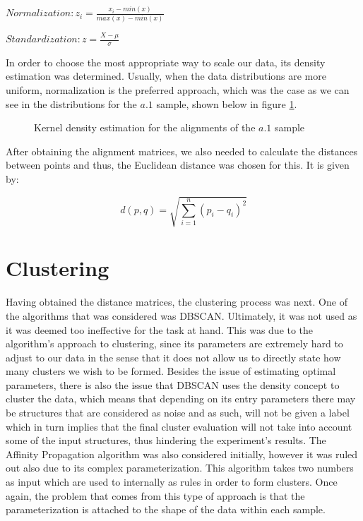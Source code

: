 	 $Normalization: z_i = \frac{x_i - min(x)}{max(x)-min(x)}$

	 $Standardization: z = \frac{X - \mu}{\sigma}$

In order to choose the most appropriate way to scale our data, its density estimation was determined. Usually, when the data distributions are more uniform, normalization is the preferred approach, which was the case as we can see in the distributions for the $a.1$ sample, shown below in figure \ref{fig:kdea1}.

\begin{figure}[htbp]
	\centering
	\newline
	\caption{Kernel density estimation for the alignments of the $a.1$ sample}
	\label{fig:kdea1}
\end{figure}

After obtaining the alignment matrices, we also needed to calculate the distances between points and thus, the Euclidean distance was chosen for this. It is given by:

	$$d(p,q) = \sqrt{\sum_{i = 1}^{n}\left( p_i - q_i \right)^2}$$


\section{Clustering}
Having obtained the distance matrices, the clustering process was next. One of the algorithms that was considered was DBSCAN. Ultimately, it was not used as it was deemed too ineffective for the task at hand. This was due to the algorithm's approach to clustering, since its parameters are extremely hard to adjust to our data in the sense that it does not allow us to directly state how many clusters we wish to be formed. Besides the issue of estimating optimal parameters, there is also the issue that DBSCAN uses the density concept to cluster the data, which means that depending on its entry parameters there may be structures that are considered as noise and as such, will not be given a label which in turn implies that the final cluster evaluation will not take into account some of the input structures, thus hindering the experiment's results. The Affinity Propagation algorithm was also considered initially, however it was ruled out also due to its complex parameterization. This algorithm takes two numbers as input which are used to internally as rules in order to form clusters. Once again, the problem that comes from this type of approach is that the parameterization is attached to the shape of the data within each sample.

